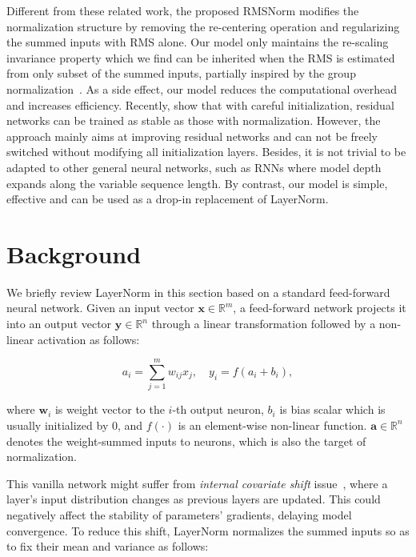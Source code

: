 Different from these related work, the proposed RMSNorm modifies the normalization structure by removing the re-centering operation and regularizing the summed inputs with RMS alone. Our model only maintains the re-scaling invariance property which we find can be inherited when the RMS is estimated from only subset of the summed inputs, partially inspired by the group normalization~\cite{wu2018group}. As a side effect, our model reduces the computational overhead and increases efficiency. Recently, \citet{zhang2018residual} show that with careful initialization, residual networks can be trained as stable as those with normalization. However, the approach mainly aims at improving residual networks and can not be freely switched without modifying all initialization layers. Besides, it is not trivial to be adapted to other general neural networks, such as RNNs where model depth expands along the variable sequence length. By contrast, our model is simple, effective and can be used as a drop-in replacement of LayerNorm.

\section{Background}

We briefly review LayerNorm in this section based on a standard feed-forward neural network. Given an input vector $\mathbf{x}\in\mathbb{R}^{m}$, a feed-forward network projects it into an output vector $\mathbf{y}\in\mathbb{R}^{n}$ through a linear transformation followed by a non-linear activation as follows:

\begin{equation}
    a_i = \sum_{j=1}^m{w_{ij} x_j},\quad y_i = f\left(a_i + b_i\right),
\end{equation}

where $\mathbf{w}_i$ is weight vector to the $i$-th output neuron, $b_i$ is bias scalar which is usually initialized by 0, and $f(\cdot)$ is an element-wise non-linear function. $\mathbf{a} \in \mathbb{R}^n$ denotes the weight-summed inputs to neurons, which is also the target of normalization.

This vanilla network might suffer from \textit{internal covariate shift} issue~\cite{Ioffe:2015:BNA:3045118.3045167}, where a layer's input distribution changes as previous layers are updated. This could negatively affect the stability of parameters' gradients, delaying model convergence. To reduce this shift, LayerNorm normalizes the summed inputs so as to fix their mean and variance as follows:

